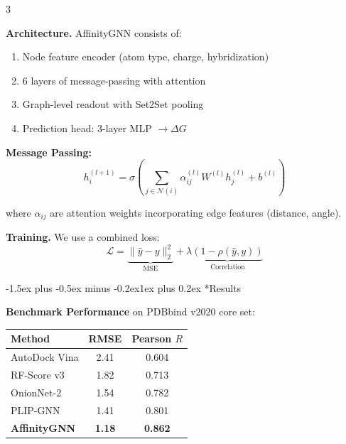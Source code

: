 \documentclass[a0paper,portrait]{article}
\makeatletter
\renewcommand{\section}{\@startsection{section}{1}{0pt}%
  {-1.5ex plus -0.5ex minus -0.2ex}{1ex plus 0.2ex}%
  {\LARGE\bfseries\color{sectioncolor}}}
\makeatother
\begin{document}
\begin{multicols}{3}
\vspace{0.5cm}

\textbf{Architecture.} AffinityGNN consists of:
\begin{enumerate}[leftmargin=1.5em, itemsep=4pt]
  \item Node feature encoder (atom type, charge, hybridization)
  \item 6 layers of message-passing with attention
  \item Graph-level readout with Set2Set pooling
  \item Prediction head: 3-layer MLP $\rightarrow \Delta G$
\end{enumerate}

\vspace{0.5cm}

\textbf{Message Passing:}
\begin{equation*}
  h_i^{(l+1)} = \sigma\!\left( \sum_{j \in \mathcal{N}(i)} \alpha_{ij}^{(l)} W^{(l)} h_j^{(l)} + b^{(l)} \right)
\end{equation*}

where $\alpha_{ij}$ are attention weights incorporating edge features (distance, angle).

\vspace{0.5cm}

\textbf{Training.} We use a combined loss:
\begin{equation*}
  \mathcal{L} = \underbrace{\|\hat{y} - y\|_2^2}_{\text{MSE}} + \lambda \underbrace{(1 - \rho(\hat{y}, y))}_{\text{Correlation}}
\end{equation*}

\columnbreak

\section*{Results}

\textbf{Benchmark Performance} on PDBbind v2020 core set:

\vspace{0.5cm}

\begin{center}
\renewcommand{\arraystretch}{1.4}
{\large
\begin{tabular}{@{}lcc@{}}
\toprule
\textbf{Method} & \textbf{RMSE} & \textbf{Pearson $R$} \\
\midrule
AutoDock Vina  & 2.41 & 0.604 \\
RF-Score v3    & 1.82 & 0.713 \\
OnionNet-2     & 1.54 & 0.782 \\
PLIP-GNN       & 1.41 & 0.801 \\
\midrule
\textbf{AffinityGNN} & \textbf{1.18} & \textbf{0.862} \\
\bottomrule
\end{tabular}}
\end{center}


\end{multicols}
\end{document}
